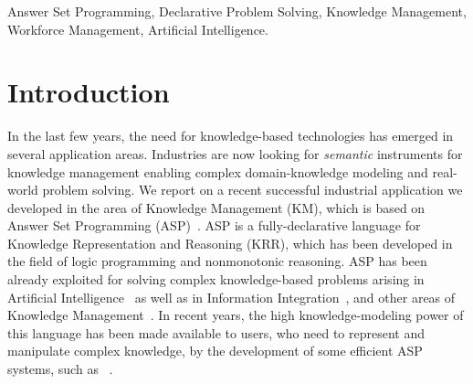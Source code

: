 \documentclass{tlp}
\begin{document}
\begin{keywords}
Answer Set Programming, Declarative Problem Solving, Knowledge Management,
Workforce Management, Artificial Intelligence.
\end{keywords}






\section{Introduction}\label{sec:intro}
In the last few years, the need for knowledge-based technologies has emerged in
several application areas.  Industries are now looking for \textit{semantic}
instruments for knowledge management 
enabling complex domain-knowledge modeling and real-world problem solving.
We report on a recent successful industrial application we developed in the area of Knowledge Management (KM), which is based on Answer Set Programming (ASP)~\cite{gelf-lifs-91}.
ASP is a fully-declarative language for Knowledge Representation and Reasoning (KRR),
which has been developed in the field of logic programming and nonmonotonic reasoning.
ASP has been already exploited for solving complex knowledge-based problems
arising in Artificial Intelligence~\cite{bara-gelf-2000,bald-etal-01,bara-uyan-2001,frie-08-techrep,fran-etal-2001,gebs-etal-2007-lpnmr-competition,noge-etal-2001}
as well as in Information Integration~\cite{leon-etal-2005},
and other areas of Knowledge Management~\cite{bara-2002,bard-95,grass-etal-09-apps-lpnmr}.
In recent years, the high knowledge-modeling power of this language
has been made available to users, who need to represent and manipulate complex knowledge,
by the development of some efficient ASP systems, such as \dlv~\cite{leon-etal-2002-dlv}.
\end{document}
